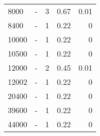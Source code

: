 \begin{longtable}{lXrrr}
        8000 & \multicolumn{1}{X}{-} & %
          \num{3} &
          \num[round-mode=places,round-precision=2]{0,67} &
          \num[round-mode=places,round-precision=2]{0,01} \\

        8400 & \multicolumn{1}{X}{-} & %
          \num{1} &
          \num[round-mode=places,round-precision=2]{0,22} &
          \num[round-mode=places,round-precision=2]{0} \\

        10000 & \multicolumn{1}{X}{-} & %
          \num{1} &
          \num[round-mode=places,round-precision=2]{0,22} &
          \num[round-mode=places,round-precision=2]{0} \\

        10500 & \multicolumn{1}{X}{-} & %
          \num{1} &
          \num[round-mode=places,round-precision=2]{0,22} &
          \num[round-mode=places,round-precision=2]{0} \\

        12000 & \multicolumn{1}{X}{-} & %
          \num{2} &
          \num[round-mode=places,round-precision=2]{0,45} &
          \num[round-mode=places,round-precision=2]{0,01} \\

        12002 & \multicolumn{1}{X}{-} & %
          \num{1} &
          \num[round-mode=places,round-precision=2]{0,22} &
          \num[round-mode=places,round-precision=2]{0} \\

        20400 & \multicolumn{1}{X}{-} & %
          \num{1} &
          \num[round-mode=places,round-precision=2]{0,22} &
          \num[round-mode=places,round-precision=2]{0} \\

        39600 & \multicolumn{1}{X}{-} & %
          \num{1} &
          \num[round-mode=places,round-precision=2]{0,22} &
          \num[round-mode=places,round-precision=2]{0} \\

        44000 & \multicolumn{1}{X}{-} & %
          \num{1} &
          \num[round-mode=places,round-precision=2]{0,22} &
          \num[round-mode=places,round-precision=2]{0} \\


\end{longtable}
